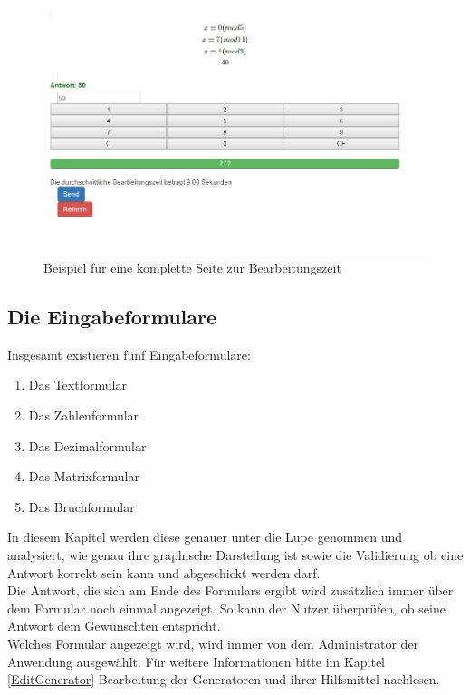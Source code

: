 \begin{figure}[htp]     %
\centering
\includegraphics[width=1\textwidth]{bilder/TotalClient} 
\caption[Beispiel für eine komplette Seite zur Bearbeitungszeit]{Beispiel für eine komplette Seite zur Bearbeitungszeit}
\end{figure} 


\subsection{Die Eingabeformulare}

Insgesamt existieren fünf Eingabeformulare:
\begin{enumerate}
\itemsep0em
\item Das Textformular
\item Das Zahlenformular
\item Das Dezimalformular
\item Das Matrixformular
\item Das Bruchformular
\end{enumerate}

In diesem Kapitel werden diese genauer unter die Lupe genommen und analysiert, wie genau ihre graphische Darstellung ist sowie die Validierung ob eine Antwort korrekt sein kann und abgeschickt werden darf. \\
Die Antwort, die sich am Ende des Formulars ergibt wird zusätzlich immer über dem Formular noch einmal angezeigt. So kann der Nutzer überprüfen, ob seine Antwort dem Gewünschten entspricht. \\
Welches Formular angezeigt wird, wird immer von dem Administrator der Anwendung ausgewählt. Für weitere Informationen bitte im Kapitel \ref{EditGenerator} Bearbeitung der Generatoren und ihrer Hilfsmittel nachlesen.


